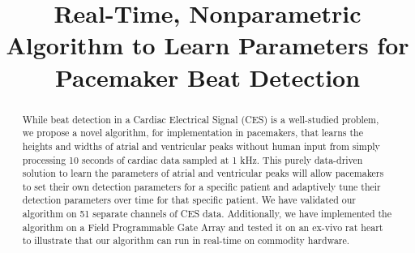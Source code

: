 \documentclass[conference]{IEEEtran}
\begin{document}
%
\title{Real-Time, Nonparametric Algorithm to Learn
Parameters for Pacemaker Beat Detection}


\author{
}







\maketitle

\begin{abstract}
While beat detection in a Cardiac Electrical 
Signal (CES) is a well-studied problem, we propose a novel
algorithm, for implementation in pacemakers, that learns the
heights and widths of atrial and ventricular peaks without human input from simply
processing 10 seconds of cardiac data sampled at 1 kHz. 
This purely data-driven solution to learn the parameters of atrial
and ventricular peaks will allow pacemakers to set their own %
detection parameters for a specific patient and adaptively tune
their detection parameters over time for that specific patient.
We have validated our algorithm on 51 separate channels of CES
data. Additionally, we have implemented the algorithm on a
Field Programmable Gate Array and tested it on an ex-vivo rat
heart to illustrate that our algorithm can run in real-time on commodity hardware.
\end{abstract}
\end{document}

